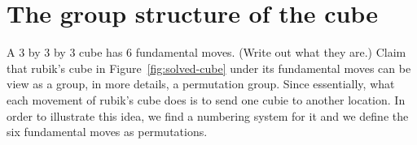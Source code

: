 \chapter{The group structure of the cube}
A 3 by 3 by 3 cube has 6 fundamental moves. (Write out what they are.)
Claim that rubik's cube in Figure~\ref{fig:solved-cube} under its fundamental moves can be view as a group, in more details, a permutation group. Since essentially, what each movement of rubik's cube does is to send one cubie to another location. In order to illustrate this idea, we find a numbering system for it and we define the six fundamental moves as permutations.
